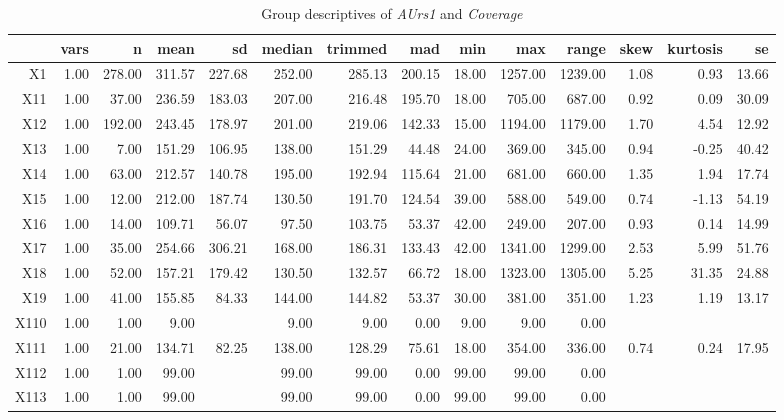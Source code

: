 \begin{table}[ht]
	\small
	\centering
	\begin{tabular}{rrrrrrrrrrrrrr}
		\toprule
		& vars & n & mean & sd & median & trimmed & mad & min & max & range & skew & kurtosis & se \\ 
		\midrule
	X1 & 1.00 & 278.00 & 311.57 & 227.68 & 252.00 & 285.13 & 200.15 & 18.00 & 1257.00 & 1239.00 & 1.08 & 0.93 & 13.66 \\ 
		X11 & 1.00 & 37.00 & 236.59 & 183.03 & 207.00 & 216.48 & 195.70 & 18.00 & 705.00 & 687.00 & 0.92 & 0.09 & 30.09 \\ 
		X12 & 1.00 & 192.00 & 243.45 & 178.97 & 201.00 & 219.06 & 142.33 & 15.00 & 1194.00 & 1179.00 & 1.70 & 4.54 & 12.92 \\ 
		X13 & 1.00 & 7.00 & 151.29 & 106.95 & 138.00 & 151.29 & 44.48 & 24.00 & 369.00 & 345.00 & 0.94 & -0.25 & 40.42 \\ 
		X14 & 1.00 & 63.00 & 212.57 & 140.78 & 195.00 & 192.94 & 115.64 & 21.00 & 681.00 & 660.00 & 1.35 & 1.94 & 17.74 \\ 
		X15 & 1.00 & 12.00 & 212.00 & 187.74 & 130.50 & 191.70 & 124.54 & 39.00 & 588.00 & 549.00 & 0.74 & -1.13 & 54.19 \\ 
		X16 & 1.00 & 14.00 & 109.71 & 56.07 & 97.50 & 103.75 & 53.37 & 42.00 & 249.00 & 207.00 & 0.93 & 0.14 & 14.99 \\ 
		X17 & 1.00 & 35.00 & 254.66 & 306.21 & 168.00 & 186.31 & 133.43 & 42.00 & 1341.00 & 1299.00 & 2.53 & 5.99 & 51.76 \\ 
		X18 & 1.00 & 52.00 & 157.21 & 179.42 & 130.50 & 132.57 & 66.72 & 18.00 & 1323.00 & 1305.00 & 5.25 & 31.35 & 24.88 \\ 
		X19 & 1.00 & 41.00 & 155.85 & 84.33 & 144.00 & 144.82 & 53.37 & 30.00 & 381.00 & 351.00 & 1.23 & 1.19 & 13.17 \\ 
		X110 & 1.00 & 1.00 & 9.00 &  & 9.00 & 9.00 & 0.00 & 9.00 & 9.00 & 0.00 &  &  &  \\ 
		X111 & 1.00 & 21.00 & 134.71 & 82.25 & 138.00 & 128.29 & 75.61 & 18.00 & 354.00 & 336.00 & 0.74 & 0.24 & 17.95 \\ 
		X112 & 1.00 & 1.00 & 99.00 &  & 99.00 & 99.00 & 0.00 & 99.00 & 99.00 & 0.00 &  &  &  \\ 
		X113 & 1.00 & 1.00 & 99.00 &  & 99.00 & 99.00 & 0.00 & 99.00 & 99.00 & 0.00 &  &  &  \\ 
		\bottomrule
	  \end{tabular}
    \caption{Group descriptives of \textit{AUrs1} and \textit{Coverage}}
    \label{tbl:descriptives_baysis_effector_AUrs1_Cov}
\end{table}

